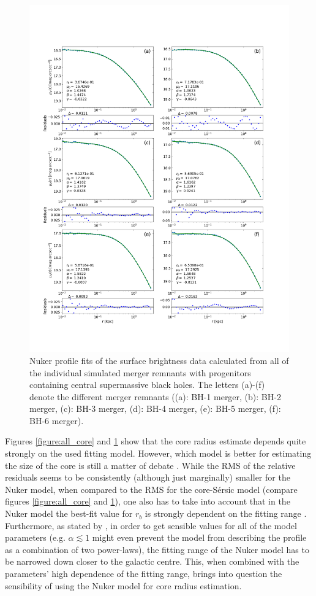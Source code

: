 \documentclass[english, oneside]{HYgradu}
\begin{document}
\begin{figure}
	\centering
	\includegraphics[width=\textwidth]{all_nuker_profiles.png}
	\caption{Nuker profile fits of the surface brightness data calculated from all of the individual simulated merger remnants with progenitors containing central supermassive black holes. The letters (a)-(f) denote the different merger remnants ((a): BH-1 merger, (b): BH-2 merger, (c): BH-3 merger, (d): BH-4 merger, (e): BH-5 merger, (f): BH-6 merger).}
	\label{figure:all_nuker}
\end{figure}

Figures \ref{figure:all_core} and \ref{figure:all_nuker} show that the core radius estimate depends quite strongly on the used fitting model. However, which model is better for estimating the size of the core is still a matter of debate \citep{Lauer2007, Dullo2012}. While the RMS of the relative residuals seems to be consistently (although just marginally) smaller for the Nuker model, when compared to the RMS for the core-Sérsic model (compare figures \ref{figure:all_core} and \ref{figure:all_nuker}), one also has to take into account that in the Nuker model the best-fit value for $r_b$ is strongly dependent on the fitting range \citep{Graham2003Nuker}. Furthermore, as stated by \cite{Rantala2018}, in order to get sensible values for all of the model parameters (e.g. $\alpha \lesssim 1$ might even prevent the model from describing the profile as a combination of two power-laws), the fitting range of the Nuker model has to be narrowed down closer to the galactic centre. This, when combined with the parameters' high dependence of the fitting range, brings into question the sensibility of using the Nuker model for core radius estimation.
\end{document}

